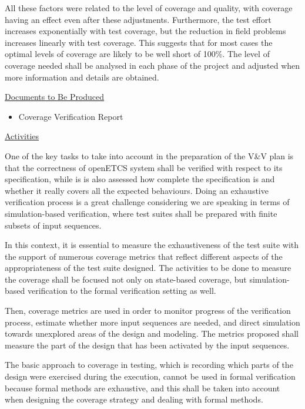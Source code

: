 All these factors were related to the level of coverage and quality,
with coverage having an effect even after these
adjustments. Furthermore, the test effort increases exponentially with
test coverage, but the reduction in field problems increases linearly
with test coverage. This suggests that for most cases the optimal
levels of coverage are likely to be well short of 100\%.  The level of
coverage needed shall be analysed in each phase of the project and
adjusted when more information and details are obtained.

\underline{Documents to Be Produced} 

\begin{itemize}
\item Coverage Verification Report
\end{itemize}

\underline{Activities}

One of the key tasks to take into account in the preparation of the
V\&V plan is that the correctness of openETCS system shall be verified
with respect to its specification, while is is also assessed how
complete the specification is and whether it really covers all the
expected behaviours.  Doing an exhaustive verification process is a
great challenge considering we are speaking in terms of
simulation-based verification, where test suites shall be prepared
with finite subsets of input sequences.

In this context, it is essential to measure the exhaustiveness of the
test suite with the support of numerous coverage metrics that reflect
different aspects of the appropriateness of the test suite
designed. The activities to be done to measure the coverage shall be
focused not only on state-based coverage, but simulation-based
verification to the formal verification setting as well.

Then, coverage metrics are used in order to monitor progress of the
verification process, estimate whether more input sequences are
needed, and direct simulation towards unexplored areas of the design
and modeling. The metrics proposed shall measure the part of the
design that has been activated by the input sequences.

The basic approach to coverage in testing, which is recording which
parts of the design were exercised during the execution, cannot be
used in formal verification because formal methods are exhaustive, and
this shall be taken into account when designing the coverage strategy
and dealing with formal methods.


